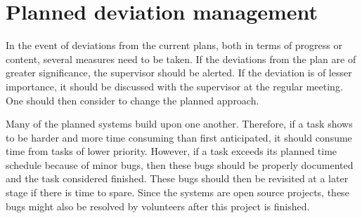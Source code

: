 \chapter{Planned deviation management}

In the event of deviations from the current plans, both in terms of progress or content, several measures need to be taken. If the deviations from the plan are of greater significance, the supervisor should be alerted. If the deviation is of lesser importance, it should be discussed with the supervisor at the regular meeting. One should then consider to change the planned approach.

Many of the planned systems build upon one another. Therefore, if a task shows to be harder and more time consuming than first anticipated, it should consume time from tasks of lower priority. However, if a task exceeds its planned time schedule because of minor bugs, then these bugs should be properly documented and the task considered finished. These bugs should then be revisited at a later stage if there is time to spare. Since the systems are open source projects, these bugs might also be resolved by volunteers after this project is finished.
